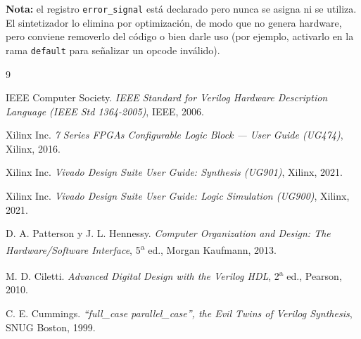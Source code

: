 \documentclass[12pt,a4paper]{article}
\begin{document}
\textbf{Nota:} el registro \texttt{error\_signal} está declarado pero nunca se
asigna ni se utiliza. El sintetizador lo elimina por optimización, de modo que
no genera hardware, pero conviene removerlo del código o bien darle uso (por
ejemplo, activarlo en la rama \texttt{default} para señalizar un opcode
inválido).

\begin{thebibliography}{9}

IEEE Computer Society.
\emph{IEEE Standard for Verilog Hardware Description Language (IEEE Std 1364-2005)},
IEEE, 2006.

Xilinx Inc.
\emph{7 Series FPGAs Configurable Logic Block --- User Guide (UG474)},
Xilinx, 2016.

Xilinx Inc.
\emph{Vivado Design Suite User Guide: Synthesis (UG901)},
Xilinx, 2021.

Xilinx Inc.
\emph{Vivado Design Suite User Guide: Logic Simulation (UG900)},
Xilinx, 2021.

D. A. Patterson y J. L. Hennessy.
\emph{Computer Organization and Design: The Hardware/Software Interface},
5\textsuperscript{a} ed., Morgan Kaufmann, 2013.

M. D. Ciletti.
\emph{Advanced Digital Design with the Verilog HDL},
2\textsuperscript{a} ed., Pearson, 2010.

C. E. Cummings.
\emph{``full\_case parallel\_case'', the Evil Twins of Verilog Synthesis},
SNUG Boston, 1999.

\end{thebibliography}
\end{document}
